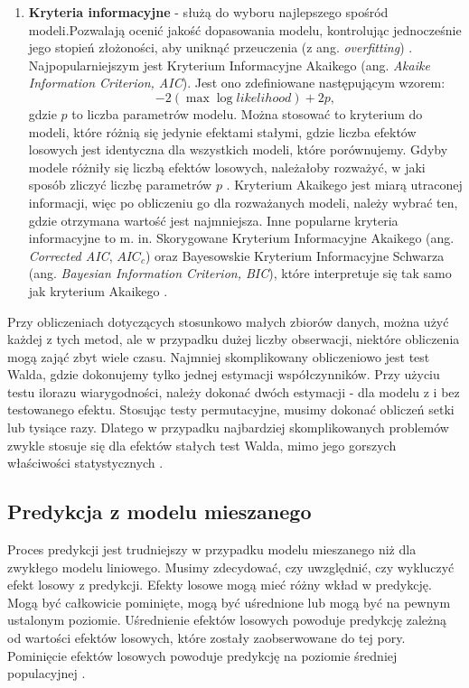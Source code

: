 \documentclass[12pt]{mwbk}
\theoremstyle{plain}
\theoremstyle{definition}
\theoremstyle{definition}
\begin{document}
\begin{enumerate}
	\item \textbf{Kryteria informacyjne} - służą do wyboru najlepszego spośród modeli.Pozwalają ocenić jakość dopasowania modelu, kontrolując jednocześnie jego stopień złożoności, aby uniknąć przeuczenia (z ang. \textit{overfitting}) \cite{szeregi}.
	 Najpopularniejszym jest Kryterium Informacyjne Akaikego (ang. \textit{Akaike Information Criterion, AIC}). Jest ono zdefiniowane następującym wzorem:
	$$-2(\operatorname{max} \operatorname{log} likelihood)+ 2p,$$
	gdzie $p$ to liczba parametrów modelu. Można stosować to kryterium do modeli, które różnią się jedynie efektami stałymi, gdzie liczba efektów losowych jest identyczna dla wszystkich modeli, które porównujemy. Gdyby modele różniły się liczbą efektów losowych, należałoby rozważyć, w jaki sposób zliczyć liczbę parametrów $p$ \cite{faraway}. Kryterium Akaikego jest miarą utraconej informacji, więc po obliczeniu go dla rozważanych modeli, należy wybrać ten, gdzie otrzymana wartość jest najmniejsza. Inne popularne kryteria informacyjne to m. in. Skorygowane Kryterium Informacyjne Akaikego (ang. \textit{Corrected AIC}, $AIC_c$) oraz Bayesowskie Kryterium Informacyjne Schwarza (ang. \textit{Bayesian Information Criterion, BIC}), które interpretuje się tak samo jak kryterium Akaikego \cite{szeregi}.

\end{enumerate}

Przy obliczeniach dotyczących stosunkowo małych zbiorów danych, można użyć każdej z tych metod, ale w przypadku dużej liczby obserwacji, niektóre obliczenia mogą zająć zbyt wiele czasu. Najmniej skomplikowany obliczeniowo jest test Walda, gdzie dokonujemy tylko jednej estymacji współczynników. Przy użyciu testu ilorazu wiarygodności, należy dokonać dwóch estymacji - dla modelu z i bez testowanego efektu. Stosując testy permutacyjne, musimy dokonać obliczeń setki lub tysiące razy. Dlatego w przypadku najbardziej skomplikowanych problemów zwykle stosuje się dla efektów stałych test Walda, mimo jego gorszych właściwości statystycznych \cite{biecek}.





\subsection{Predykcja z modelu mieszanego}
Proces predykcji jest trudniejszy w przypadku modelu mieszanego niż dla zwykłego modelu liniowego. Musimy zdecydować, czy uwzględnić, czy wykluczyć efekt losowy z predykcji. Efekty losowe mogą mieć różny wkład w predykcję. Mogą być całkowicie pominięte, mogą być uśrednione lub mogą być na pewnym ustalonym poziomie. Uśrednienie efektów losowych powoduje predykcję zależną od wartości efektów losowych, które zostały zaobserwowane do tej pory. Pominięcie efektów losowych powoduje predykcję na poziomie średniej populacyjnej
 \cite{prediction}.
 
\end{document}
